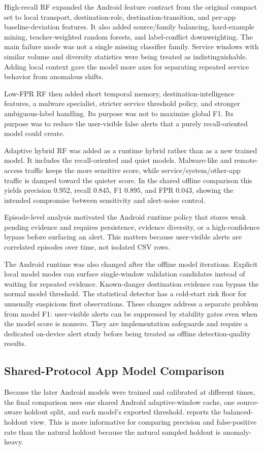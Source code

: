 High-recall RF expanded the Android feature contract from the original compact set to local
transport, destination-role, destination-transition, and per-app baseline-deviation features. It
also added source/family balancing, hard-example mining, teacher-weighted random forests, and
label-conflict downweighting. The main failure mode was not a single missing classifier family.
Service windows with similar volume and diversity statistics were being treated as
indistinguishable. Adding local context gave the model more axes for separating repeated service
behavior from anomalous shifts.

Low-FPR RF then added short temporal memory, destination-intelligence features, a malware
specialist, stricter service threshold policy, and stronger ambiguous-label handling. Its purpose
was not to maximize global F1. Its purpose was to reduce the user-visible false alerts that a purely
recall-oriented model could create.

Adaptive hybrid RF was added as a runtime hybrid rather than as a new trained model. It includes the
recall-oriented and quiet models. Malware-like and remote-access traffic keeps the more sensitive
score, while service/system/other-app traffic is damped toward the quieter score. In the shared
offline comparison this yields precision \(0.952\), recall \(0.845\), F1 \(0.895\), and FPR
\(0.043\), showing the intended compromise between sensitivity and alert-noise control.

Episode-level analysis motivated the Android runtime policy that stores weak pending evidence and
requires persistence, evidence diversity, or a high-confidence bypass before surfacing an alert.
This matters because user-visible alerts are correlated episodes over time, not isolated CSV rows.

The Android runtime was also changed after the offline model iterations. Explicit local model modes
can surface single-window validation candidates instead of waiting for repeated evidence. Known-danger destination evidence can bypass the normal model threshold. The statistical detector has a
cold-start risk floor for unusually suspicious first observations. These changes address a separate
problem from model F1: user-visible alerts can be suppressed by stability gates even when the model
score is nonzero. They are implementation safeguards and require a dedicated on-device alert study
before being treated as offline detection-quality results.

\subsection{Shared-Protocol App Model Comparison}
Because the later Android models were trained and calibrated at different times, the final
comparison uses one shared Android adaptive-window cache, one source-aware holdout split, and each
model's exported threshold.  reports the
balanced-holdout view. This is more informative for comparing precision and false-positive rate than
the natural holdout because the natural sampled holdout is anomaly-heavy.


